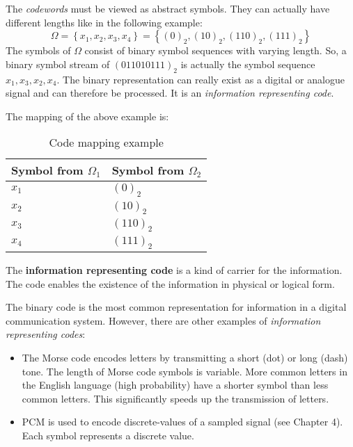 \begin{refsection}
The \emph{codewords} must be viewed as abstract symbols. They can actually have different lengths like in the following example:
\begin{equation}
	\Omega = \left\{x_1, x_2, x_3, x_4\right\} = \left\{\left(0\right)_2, \left(10\right)_2, \left(110\right)_2, \left(111\right)_2\right\}
\end{equation}
The symbols of $\Omega$ consist of binary symbol sequences with varying length. So, a binary symbol stream of $\left(011010111\right)_2$ is actually the symbol sequence $x_1, x_3, x_2, x_4$. The binary representation can really exist as a digital or analogue signal and can therefore be processed. It is an \emph{information representing code}.

The mapping of the above example is:
\begin{table}[H]
	\caption{Code mapping example}
	\begin{tabular}{|l|l|}
		\hline
		Symbol from $\Omega_1$ & Symbol from $\Omega_2$ \\
		\hline
		\hline
		$x_1$ & $\left(0\right)_2$ \\
		\hline
		$x_2$ & $\left(10\right)_2$ \\
		\hline
		$x_3$ & $\left(110\right)_2$ \\
		\hline
		$x_4$ & $\left(111\right)_2$ \\
		\hline
	\end{tabular}
\end{table}

The  \textbf{information representing code} is a kind of carrier for the information. The code enables the existence of the information in physical or logical form.

The binary code is the most common representation for information in a digital communication system. However, there are other examples of \emph{information representing codes}:
\begin{itemize}
	\item The Morse code encodes letters by transmitting a short (dot) or long (dash) tone. The length of Morse code symbols is variable. More common letters in the English language (high probability) have a shorter symbol than less common letters. This significantly speeds up the transmission of letters.
	\item \ac{PCM} is used to encode discrete-values of a sampled signal (see Chapter 4). Each symbol represents a discrete value.
\end{itemize}


\end{refsection}

